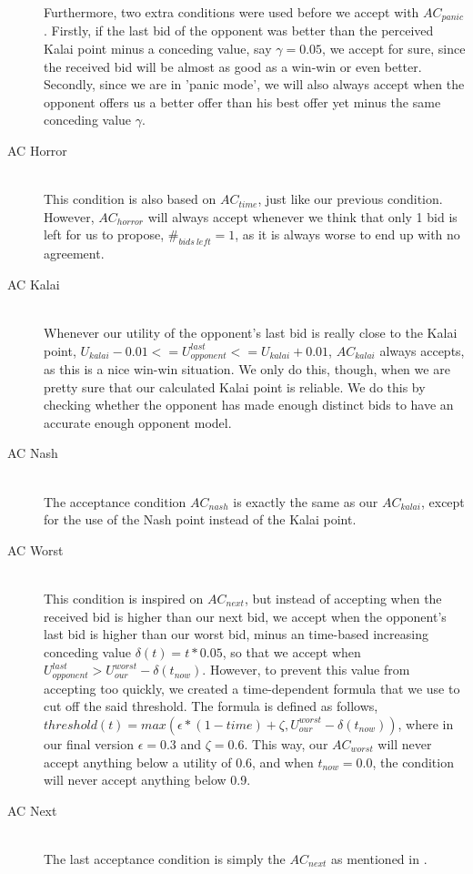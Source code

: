 \begin{description}
Furthermore, two extra conditions were used before we accept with $AC_{panic}$. Firstly, if the last bid of the opponent was better than the perceived Kalai point minus a conceding value, say $\gamma = 0.05$, we accept for sure, since the received bid will be almost as good as a win-win or even better. Secondly, since we are in 'panic mode', we will also always accept when the opponent offers us a better offer than his best offer yet minus the same conceding value $\gamma$.

  \item[AC Horror] \hfill \\
This condition is also based on $AC_{time}$, just like our previous condition. However, $AC_{horror}$ will always accept whenever we think that only 1 bid is left for us to propose, $\#_{bids~left} = 1$, as it is always worse to end up with no agreement.

  \item[AC Kalai] \hfill \\
Whenever our utility of the opponent's last bid is really close to the Kalai point, $U_{kalai} - 0.01 <= U_{opponent}^{last} <= U_{kalai} + 0.01$, $AC_{kalai}$ always accepts, as this is a nice win-win situation. We only do this, though, when we are pretty sure that our calculated Kalai point is reliable. We do this by checking whether the opponent has made enough distinct bids to have an accurate enough opponent model.

  \item[AC Nash] \hfill \\
The acceptance condition $AC_{nash}$ is exactly the same as our $AC_{kalai}$, except for the use of the Nash point instead of the Kalai point.

  \item[AC Worst] \hfill \\
This condition is inspired on $AC_{next}$\cite{baarslag2013acceptance}, but instead of accepting when the received bid is higher than our next bid, we accept when the opponent's last bid is higher than our worst bid, minus an time-based increasing conceding value $\delta(t) = t * 0.05$, so that we accept when $U_{opponent}^{last} > U_{our}^{worst} - \delta(t_{now})$. However, to prevent this value from accepting too quickly, we created a time-dependent formula that we use to cut off the said threshold. The formula is defined as follows, $threshold(t) = max(\epsilon * (1-time) + \zeta, U_{our}^{worst} - \delta(t_{now}))$, where in our final version $\epsilon = 0.3$ and $\zeta = 0.6$. This way, our $AC_{worst}$ will never accept anything below a utility of 0.6, and when $t_{now} = 0.0$, the condition will never accept anything below 0.9.

  \item[AC Next] \hfill \\
The last acceptance condition is simply the $AC_{next}$ as mentioned in \cite{baarslag2013acceptance}.

\end{description}

